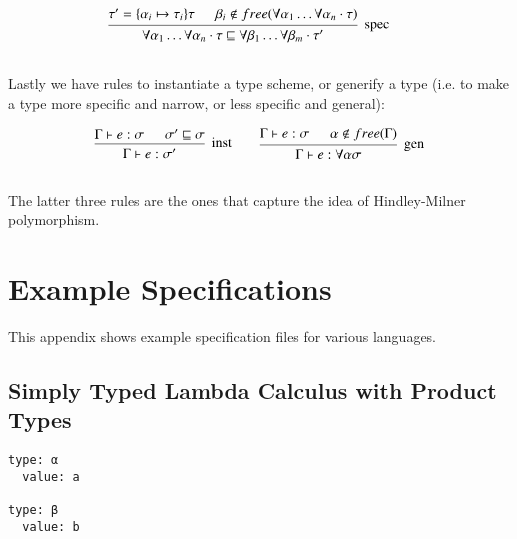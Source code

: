 \begin{appendices}
\[\begin{array}{c@{\qquad}c}  
    \mbox{\begin{prooftree}
      \hypo{\tau' = \{\alpha_i \mapsto \tau_i\}\tau}
      \hypo{\beta_i \notin free(\forall \alpha_1 \ldots \forall
        \alpha_n \cdot \tau)}
      \infer2[spec]{\forall \alpha_1 \ldots \forall \alpha_n \cdot
        \tau \sqsubseteq \forall \beta_1 \ldots \forall
        \beta_m \cdot \tau' }
    \end{prooftree}}
    \\\\
\end{array} \]  
  
Lastly we have rules to instantiate a type scheme, or generify a
type (i.e. to make a type more specific and narrow, or less specific
and general):

\[\begin{array}{c@{\qquad}c}  
    \mbox{\begin{prooftree}
      \hypo{\Gamma \vdash e : \sigma}
      \hypo{\sigma' \sqsubseteq \sigma}
      \infer2[inst]{\Gamma \vdash e : \sigma'}
    \end{prooftree}}
    &
    \mbox{\begin{prooftree}
      \hypo{\Gamma \vdash e : \sigma}
      \hypo{\alpha \notin free(\Gamma)}
      \infer2[gen]{\Gamma \vdash e : \forall \alpha \sigma}
    \end{prooftree}}
    \\\\
\end{array} \]

The latter three rules are the ones that capture the idea of
Hindley-Milner polymorphism.

\clearpage
\section{Example Specifications}
\label{appendix:examplespecifications}

This appendix shows example specification files for various
languages.

\subsection{Simply Typed Lambda Calculus with Product Types}
\label{STLCspec}

\begin{verbatim}
type: α
  value: a

type: β
  value: b


\end{verbatim}
\end{appendices}
